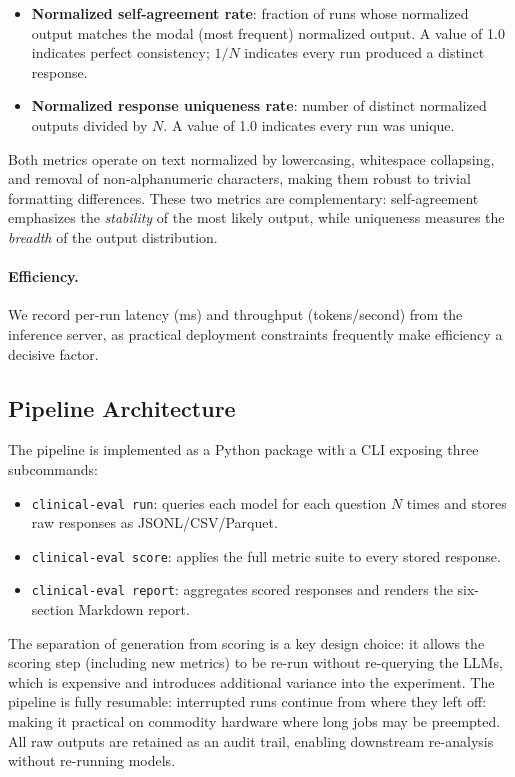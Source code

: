 \documentclass[11pt,twocolumn]{article}
\begin{document}
\begin{itemize}
  \item \textbf{Normalized self-agreement rate}: fraction of runs
        whose normalized output matches the modal (most frequent)
        normalized output.
        A value of 1.0 indicates perfect consistency; $1/N$ indicates
        every run produced a distinct response.
  \item \textbf{Normalized response uniqueness rate}: number of
        distinct normalized outputs divided by $N$.
        A value of 1.0 indicates every run was unique.
\end{itemize}

Both metrics operate on text normalized by lowercasing,
whitespace collapsing, and removal of non-alphanumeric characters,
making them robust to trivial formatting differences.
These two metrics are complementary: self-agreement emphasizes
the \emph{stability} of the most likely output, while uniqueness
measures the \emph{breadth} of the output distribution.

\paragraph{Efficiency.}
We record per-run latency (ms) and throughput (tokens/second)
from the inference server, as practical deployment constraints
frequently make efficiency a decisive factor.

\subsection{Pipeline Architecture}

The pipeline is implemented as a Python package with a CLI exposing
three subcommands:

\begin{itemize}
  \item \texttt{clinical-eval run}: queries each model for each
        question $N$ times and stores raw responses as
        JSONL/CSV/Parquet.
  \item \texttt{clinical-eval score}: applies the full metric
        suite to every stored response.
  \item \texttt{clinical-eval report}: aggregates scored
        responses and renders the six-section Markdown report.
\end{itemize}

The separation of generation from scoring is a key design choice:
it allows the scoring step (including new metrics) to be re-run
without re-querying the LLMs, which is expensive and introduces
additional variance into the experiment.
The pipeline is fully resumable: interrupted runs continue from
where they left off: making it practical on commodity hardware
where long jobs may be preempted.
All raw outputs are retained as an audit trail, enabling downstream
re-analysis without re-running models.
\end{document}
